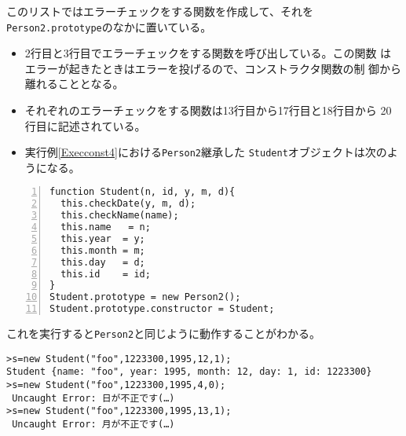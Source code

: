 このリストではエラーチェックをする関数を作成して、それを
 \texttt{Person2.prototype}のなかに置いている。
\begin{itemize}
 \item 2行目と3行目でエラーチェックをする関数を呼び出している。この関数
			 はエラーが起きたときはエラーを投げるので、コンストラクタ関数の制
			 御から離れることとなる。
 \item それぞれのエラーチェックをする関数は13行目から17行目と18行目から
			 20行目に記述されている。
 \item 実行例\ref{Execconst4}における\texttt{Person2}継承した
			 \texttt{Student}オブジェクトは次のようになる。
\end{itemize}
\begin{Verbatim}[numbers=left]
function Student(n, id, y, m, d){
  this.checkDate(y, m, d);
  this.checkName(name);
  this.name   = n;
  this.year  = y;
  this.month = m;
  this.day   = d;
  this.id    = id;
}
Student.prototype = new Person2();
Student.prototype.constructor = Student;
\end{Verbatim}
これを実行すると\texttt{Person2}と同じように動作することがわかる。
\begin{Verbatim}
>s=new Student("foo",1223300,1995,12,1);
Student {name: "foo", year: 1995, month: 12, day: 1, id: 1223300}
>s=new Student("foo",1223300,1995,4,0);
 Uncaught Error: 日が不正です(…)
>s=new Student("foo",1223300,1995,13,1);
 Uncaught Error: 月が不正です(…)
\end{Verbatim}
